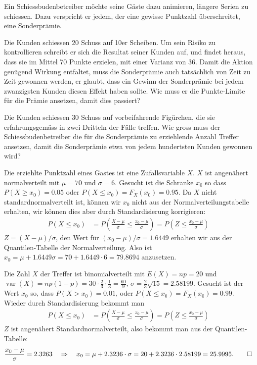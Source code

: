 Ein Schiessbudenbetreiber möchte seine Gäste dazu animieren,
längere Serien zu schiessen. Dazu verspricht er jedem, der eine
gewisse Punktzahl überschreitet, eine Sonderprämie.
\begin{teilaufgaben}
\item
Die Kunden schiessen 20 Schuss auf 10er Scheiben. Um sein Risiko
zu kontrollieren schreibt er sich die Resultat seiner Kunden auf,
und findet heraus, dass sie im Mittel 70 Punkte erzielen, mit einer
Varianz von 36. Damit die Aktion genügend Wirkung entfaltet,
muss die Sonderprämie auch tatsächlich von Zeit zu Zeit
gewonnen werden, er glaubt, dass ein Gewinn der Sonderprämie
bei jedem zwanzigsten Kunden diesen Effekt haben sollte. Wie
muss er die Punkte-Limite für die Prämie ansetzen, damit dies
passiert?
\item
Die Kunden schiessen 30 Schuss auf vorbeifahrende Figürchen, die
sie erfahrungsgemäss in zwei Dritteln der Fälle treffen. Wie
gross muss der Schiessbudenbetreiber die für die Sonderprämie
zu erziehlende Anzahl Treffer ansetzen, damit die Sonderprämie
etwa von jedem hundertsten Kunden gewonnen wird?
\end{teilaufgaben}


\begin{loesung}
\begin{teilaufgaben}
\item
Die erziehlte Punktzahl eines Gastes ist eine Zufallsvariable $X$.
$X$ ist angenähert normalverteilt mit $\mu=70$ und
$\sigma=6$. Gesucht ist die Schranke $x_0$ so dass
$P(X\ge x_0)=0.05$ oder $P(X\le x_0)=F_X(x_0)=0.95$.
Da $X$ nicht standardnormalverteilt ist, können wir $x_0$ nicht
aus der Normalverteilungstabelle erhalten, wir können dies aber
durch Standardisierung korrigieren:
\begin{align*}
P(X\le x_0)
&=
P\left(\frac{X-\mu}{\sigma}\le\frac{x_0-\mu}{\sigma}\right)
=
P\left(Z\le \frac{x_0-\mu}{\sigma}\right)
\end{align*}
$Z=(X-\mu)/\sigma$, den Wert für $(x_0-\mu)/\sigma=1.6449$ erhalten
wir aus der Quantilen-Tabelle der Normalverteilung. Also ist
$x_0=\mu +1.6449\sigma=70 + 1.6449\cdot 6=79.8694$ anzusetzen.
\item
Die Zahl $X$ der Treffer ist binomialverteilt mit $E(X) = np=20$ und
$\operatorname{var}(X)=np(1-p)=30\cdot\frac23\cdot\frac13=\frac{60}{9}$,
$\sigma = \frac23\sqrt{15}=2.58199$.
Gesucht ist der Wert $x_0$ so, dass $P(X>x_0)=0.01$, oder
$P(X\le x_0)=F_X(x_0)=0.99$. Wieder durch Standardisierung bekommt
man
\begin{align*}
P(X\le x_0)
&=
P\left(
\frac{X-\mu}{\sigma}\le\frac{x_0-\mu}{\sigma}
\right)
=
P\left(
Z\le \frac{x_0-\mu}{\sigma}
\right)
\end{align*}
$Z$ ist angenähert Standardnormalverteilt, also bekommt man aus
der Quantilen-Tabelle:
\[
\frac{x_0-\mu}{\sigma}=2.3263
\quad
\Rightarrow
\quad
x_0=\mu+2.3236\cdot \sigma=20 + 2.3236\cdot 2.58199 = 25.9995.
\qedhere
\]
\end{teilaufgaben}
\end{loesung}

